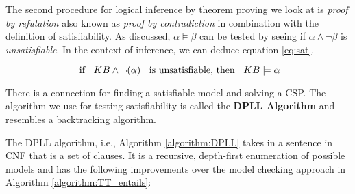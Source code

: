 The second procedure for logical inference by theorem proving we look at is \textit{proof by refutation} also known as \textit{proof by contradiction} in combination with the definition of satisfiability. As discussed, $\alpha \models \beta$ can be tested by seeing if $\alpha \wedge \neg \beta$ is \textit{unsatisfiable}. In the context of inference, we can deduce equation \ref{eq:sat}.


\begin{equation}
\text{  if } \hspace{0.2cm} KB \wedge \neg (\alpha) \hspace{0.2cm} \text{  is unsatisfiable,  then  } \hspace{0.2cm} KB \models \alpha
\label{eq:sat}
\end{equation}

There is a connection for finding a satisfiable model and solving a CSP. The algorithm we use for testing satisfiability is called the \textbf{DPLL Algorithm} and resembles a backtracking algorithm. 


The DPLL algorithm, i.e., Algorithm \ref{algorithm:DPLL} takes in a sentence in CNF that is a set of clauses. It is a recursive, depth-first enumeration of possible models and has the following improvements over the model checking approach in Algorithm \ref{algorithm:TT_entails}:

